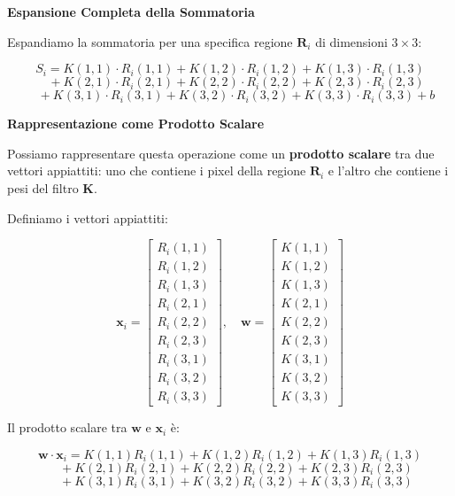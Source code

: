 \noindent\textbf{Espansione Completa della Sommatoria}

\vspace{0.5em} %

\noindent Espandiamo la sommatoria per una specifica regione \( \mathbf{R}_i \) di dimensioni \( 3 \times 3 \):

\[
S_i = K(1,1) \cdot R_i(1,1) + K(1,2) \cdot R_i(1,2) + K(1,3) \cdot R_i(1,3) 
\]
\[
\quad + K(2,1) \cdot R_i(2,1) + K(2,2) \cdot R_i(2,2) + K(2,3) \cdot R_i(2,3) 
\]
\[
\quad + K(3,1) \cdot R_i(3,1) + K(3,2) \cdot R_i(3,2) + K(3,3) \cdot R_i(3,3) + b
\]

\noindent\textbf{Rappresentazione come Prodotto Scalare}

\vspace{0.5em} %

\noindent Possiamo rappresentare questa operazione come un \textbf{prodotto scalare} tra due vettori appiattiti: uno che contiene i pixel della regione \( \mathbf{R}_i \) e l'altro che contiene i pesi del filtro \( \mathbf{K} \).

Definiamo i vettori appiattiti:

\[
\mathbf{x}_i = \begin{bmatrix}
R_i(1,1) \\
R_i(1,2) \\
R_i(1,3) \\
R_i(2,1) \\
R_i(2,2) \\
R_i(2,3) \\
R_i(3,1) \\
R_i(3,2) \\
R_i(3,3)
\end{bmatrix}, \quad 
\mathbf{w} = \begin{bmatrix}
K(1,1) \\
K(1,2) \\
K(1,3) \\
K(2,1) \\
K(2,2) \\
K(2,3) \\
K(3,1) \\
K(3,2) \\
K(3,3)
\end{bmatrix}
\]

Il prodotto scalare tra \( \mathbf{w} \) e \( \mathbf{x}_i \) è:

\[
\mathbf{w} \cdot \mathbf{x}_i = K(1,1)R_i(1,1) + K(1,2)R_i(1,2) + K(1,3)R_i(1,3) 
\]
\[
\quad + K(2,1)R_i(2,1) + K(2,2)R_i(2,2) + K(2,3)R_i(2,3) 
\]
\[
\quad + K(3,1)R_i(3,1) + K(3,2)R_i(3,2) + K(3,3)R_i(3,3)
\]


